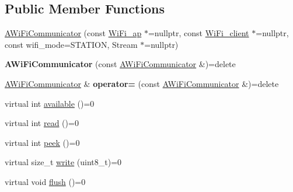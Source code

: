 \subsection*{Public Member Functions}
\begin{DoxyCompactItemize}
\item 
\mbox{\hyperlink{classwood_box_1_1communication_1_1wifi_1_1_a_wi_fi_communicator_a9d1dc13ca9243170b04211bef2b86ed2}{A\+Wi\+Fi\+Communicator}} (const \mbox{\hyperlink{structwood_box_1_1communication_1_1wifi_1_1s__wifi__access__point}{Wi\+Fi\+\_\+ap}} $\ast$=nullptr, const \mbox{\hyperlink{structwood_box_1_1communication_1_1wifi_1_1s__wifi__client}{Wi\+Fi\+\_\+client}} $\ast$=nullptr, const wifi\+\_\+mode=S\+T\+A\+T\+I\+ON, Stream $\ast$=nullptr)
\item 
\mbox{\label{classwood_box_1_1communication_1_1wifi_1_1_a_wi_fi_communicator_aef6faae3bf738776f0fb437a45c27883}} 
{\bfseries A\+Wi\+Fi\+Communicator} (const \mbox{\hyperlink{classwood_box_1_1communication_1_1wifi_1_1_a_wi_fi_communicator}{A\+Wi\+Fi\+Communicator}} \&)=delete
\item 
\mbox{\label{classwood_box_1_1communication_1_1wifi_1_1_a_wi_fi_communicator_a9f3c118a4268d09632f483aeb736a7c8}} 
\mbox{\hyperlink{classwood_box_1_1communication_1_1wifi_1_1_a_wi_fi_communicator}{A\+Wi\+Fi\+Communicator}} \& {\bfseries operator=} (const \mbox{\hyperlink{classwood_box_1_1communication_1_1wifi_1_1_a_wi_fi_communicator}{A\+Wi\+Fi\+Communicator}} \&)=delete
\item 
virtual int \mbox{\hyperlink{classwood_box_1_1communication_1_1wifi_1_1_a_wi_fi_communicator_a541a26bf14cf77c13cc960963944ba1d}{available}} ()=0
\item 
virtual int \mbox{\hyperlink{classwood_box_1_1communication_1_1wifi_1_1_a_wi_fi_communicator_af4bc1adc96c124e769eb8c54d76476cf}{read}} ()=0
\item 
virtual int \mbox{\hyperlink{classwood_box_1_1communication_1_1wifi_1_1_a_wi_fi_communicator_ae0a1f2f1906f76a12dd5f9b7c10b1282}{peek}} ()=0
\item 
virtual size\+\_\+t \mbox{\hyperlink{classwood_box_1_1communication_1_1wifi_1_1_a_wi_fi_communicator_a7c40345fe59737b83bfee33ecb7be013}{write}} (uint8\+\_\+t)=0
\item 
virtual void \mbox{\hyperlink{classwood_box_1_1communication_1_1wifi_1_1_a_wi_fi_communicator_a1c74b8bc27a89604b4b7daa94c0168a6}{flush}} ()=0

\end{DoxyCompactItemize}
